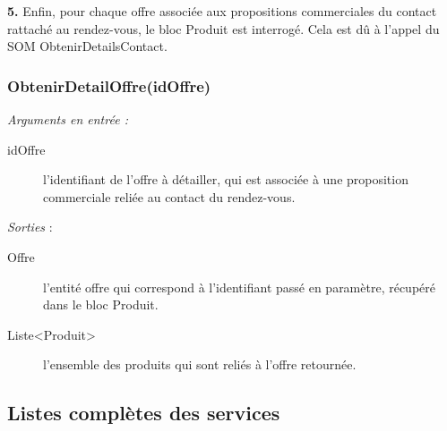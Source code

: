 \begin{shaded}
\textbf{5.} Enfin, pour chaque offre associée aux propositions commerciales du contact rattaché au rendez-vous, le bloc Produit est interrogé. Cela est dû à l'appel du SOM ObtenirDetailsContact. 
\end{shaded}


\subsubsection{ObtenirDetailOffre(idOffre)}

\noindent \textit{Arguments en entrée :} 
\begin{description}
\item[idOffre] l'identifiant de l'offre à détailler, qui est associée à une proposition commerciale reliée au contact du rendez-vous. \\
\end{description} 

\noindent \textit{Sorties} :
\begin{description}
\item[Offre] l'entité offre qui correspond à l'identifiant passé en paramètre, récupéré dans le bloc Produit. 
\item[Liste<Produit>] l'ensemble des produits qui sont reliés à l'offre retournée.
\end{description} 
\restoregeometry

\subsection{Listes complètes des services}

